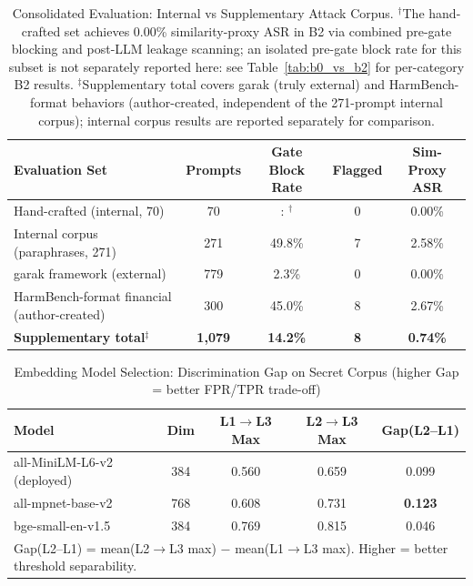 \documentclass[journal]{IEEEtran}
\begin{document}
\begin{table}[!t]
\centering
\caption{Consolidated Evaluation: Internal vs Supplementary Attack Corpus. $^\dagger$The hand-crafted set achieves 0.00\% similarity-proxy ASR in B2 via combined pre-gate blocking and post-LLM leakage scanning; an isolated pre-gate block rate for this subset is not separately reported here: see Table~\ref{tab:b0_vs_b2} for per-category B2 results. $^\ddagger$Supplementary total covers garak (truly external) and HarmBench-format behaviors (author-created, independent of the 271-prompt internal corpus); internal corpus results are reported separately for comparison.}
\label{tab:external_framework}
\begin{tabular}{lcccc}
\toprule
\textbf{Evaluation Set} & \textbf{Prompts} & \textbf{Gate Block Rate} & \textbf{Flagged} & \textbf{Sim-Proxy ASR} \\
\midrule
 Hand-crafted (internal, 70) & 70 &: $^\dagger$ & 0 & 0.00\% \\
  Internal corpus (paraphrases, 271) & 271 & 49.8\% & 7 & 2.58\% \\
\midrule
  garak framework (external) & 779 & 2.3\% & 0 & 0.00\% \\
  HarmBench-format financial (author-created) & 300 & 45.0\% & 8 & 2.67\% \\
\midrule
  \textbf{Supplementary total}$^\ddagger$ & \textbf{1,079} & \textbf{14.2\%} & \textbf{8} & \textbf{0.74\%} \\
\bottomrule
\end{tabular}
\end{table}

\begin{table}[!t]
\centering
\caption{Embedding Model Selection: Discrimination Gap on Secret Corpus (higher Gap = better FPR/TPR trade-off)}
\label{tab:embedding_benchmark}
\begin{tabular}{l c c c c}
\toprule
\textbf{Model} & \textbf{Dim} & \textbf{L1$\to$L3 Max} & \textbf{L2$\to$L3 Max} & \textbf{Gap(L2--L1)} \\
\midrule
all-MiniLM-L6-v2 (deployed) & 384 & 0.560 & 0.659 & 0.099 \\
\rowcolor{babyblue}
all-mpnet-base-v2           & 768 & 0.608 & 0.731 & \textbf{0.123} \\
\arrayrulecolor{black}bge-small-en-v1.5           & 384 & 0.769 & 0.815 & 0.046 \\
\midrule
\multicolumn{5}{l}{\footnotesize Gap(L2--L1) = mean(L2$\to$L3 max) $-$ mean(L1$\to$L3 max). Higher = better threshold separability.} \\
\bottomrule
\end{tabular}
\end{table}
\end{document}
